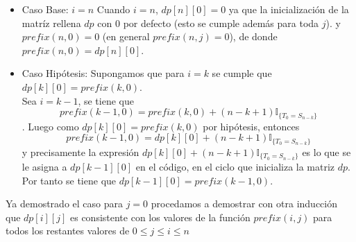 \documentclass[a4paper]{article}
\begin{document}
\begin{itemize}
    \item Caso Base: $i = n$
    Cuando $i=n$, $dp[n][0] = 0$ ya que la inicializaci\'on de la matr\'iz rellena $dp$ con $0$ por defecto (esto se cumple adem\'as para toda $j$). 
    y  $prefix(n,0)=0$ (en general $prefix(n,j) = 0$), de donde $prefix(n,0)= dp[n][0]$.

    \item Caso Hip\'otesis: Supongamos que para $i = k$ se cumple que $dp[k][0] = prefix(k,0)$.\\ 
    
    Sea $i = k-1$, se tiene que $$prefix(k-1,0) = prefix(k,0) + (n-k+1)\mathbb{I}_{\{ T_0 = S_{n-k}\}}$$.
    Luego como $dp[k][0] = prefix(k,0)$ por hip\'otesis, entonces 
    $$prefix(k-1,0) = dp[k][0] + (n-k+1)\mathbb{I}_{\{ T_0 = S_{n-k}\}}$$ y precisamente la expresi\'on 
    $dp[k][0] + (n-k+1)\mathbb{I}_{\{ T_0 = S_{n-k}\}} $ es lo que se le asigna a $dp[k-1][0]$ en el c\'odigo, en el ciclo que 
    inicializa la matriz $dp$. Por tanto se tiene que $dp[k-1][0] = prefix(k-1,0)$.

\end{itemize}

Ya demostrado el caso para $j=0$ procedamos a demostrar con otra inducci\'on que $dp[i][j]$ es consistente con los valores de la funci\'on $prefix(i,j)$ para 
todos los restantes valores de $0 \leq j \leq i \leq n$
\end{document}
